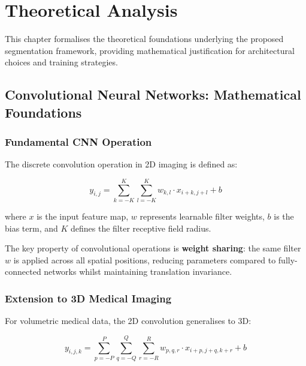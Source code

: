 \documentclass{ecsproject}     %
\begin{document}

\chapter{Theoretical Analysis} \label{Chapter:Theoretical}

This chapter formalises the theoretical foundations underlying the proposed segmentation framework, providing mathematical justification for architectural choices and training strategies.

\section{Convolutional Neural Networks: Mathematical Foundations}

\subsection{Fundamental CNN Operation}

The discrete convolution operation in 2D imaging is defined as:

\begin{equation}
y_{i,j} = \sum_{k=-K}^{K} \sum_{l=-K}^{K} w_{k,l} \cdot x_{i+k,j+l} + b
\label{Eq:Conv2D}
\end{equation}

where $x$ is the input feature map, $w$ represents learnable filter weights, $b$ is the bias term, and $K$ defines the filter receptive field radius.

The key property of convolutional operations is \textbf{weight sharing}: the same filter $w$ is applied across all spatial positions, reducing parameters compared to fully-connected networks whilst maintaining translation invariance.

\subsection{Extension to 3D Medical Imaging}

For volumetric medical data, the 2D convolution generalises to 3D:

\begin{equation}
y_{i,j,k} = \sum_{p=-P}^{P} \sum_{q=-Q}^{Q} \sum_{r=-R}^{R} w_{p,q,r} \cdot x_{i+p,j+q,k+r} + b
\label{Eq:Conv3D}
\end{equation}
\end{document}
